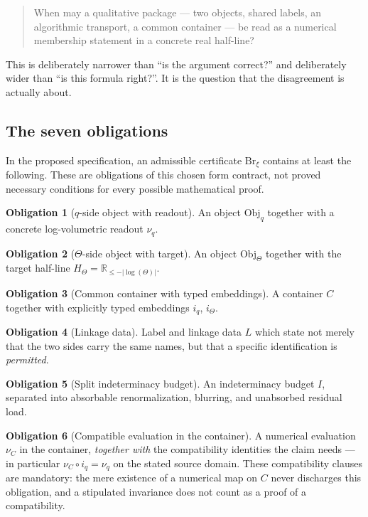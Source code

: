 \documentclass[11pt,a4paper]{article}
\theoremstyle{definition}
\newtheorem{obligation}{Obligation}
\newcommand{\Brxi}{\mathrm{Br}_{\xi}}
\begin{document}
\begin{quote}
When may a qualitative package --- two objects, shared labels, an algorithmic
transport, a common container --- be read as a numerical membership statement in
a concrete real half-line?
\end{quote}

This is deliberately narrower than ``is the argument correct?'' and deliberately
wider than ``is this formula right?''. It is the question that the disagreement is
actually about.

\subsection{The seven obligations}
\label{sec:obligations}

In the proposed specification, an admissible certificate $\Brxi$ contains at
least the following. These are obligations of this chosen form contract, not
proved necessary conditions for every possible mathematical proof.

\begin{obligation}[$q$-side object with readout]
An object $\mathrm{Obj}_q$ together with a concrete log-volumetric readout
$\nu_q$.
\end{obligation}

\begin{obligation}[$\Theta$-side object with target]
An object $\mathrm{Obj}_\Theta$ together with the target half-line
$H_\Theta = \mathbb{R}_{\le -|\log(\Theta)|}$.
\end{obligation}

\begin{obligation}[Common container with typed embeddings]
A container $C$ together with explicitly typed embeddings $i_q$, $i_\Theta$.
\end{obligation}

\begin{obligation}[Linkage data]
Label and linkage data $L$ which state not merely that the two sides carry the
same names, but that a specific identification is \emph{permitted}.
\end{obligation}

\begin{obligation}[Split indeterminacy budget]
An indeterminacy budget $I$, separated into absorbable renormalization, blurring,
and unabsorbed residual load.
\end{obligation}

\begin{obligation}[Compatible evaluation in the container]
\label{obl:six}
A numerical evaluation $\nu_C$ in the container, \emph{together with} the
compatibility identities the claim needs --- in particular
$\nu_C \circ i_q = \nu_q$ on the stated source domain. These compatibility
clauses are mandatory: the mere existence of a numerical map on $C$ never
discharges this obligation, and a stipulated invariance does not count as a
proof of a compatibility.
\end{obligation}
\end{document}
